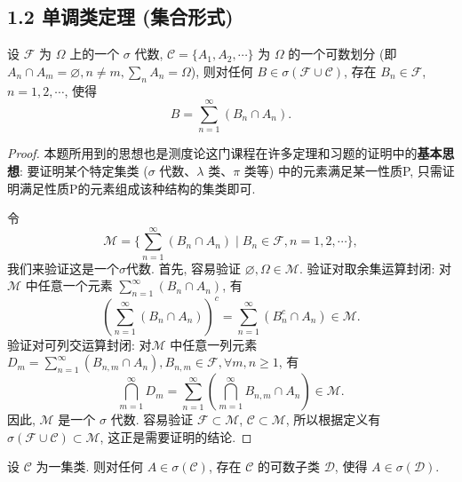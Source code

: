     \subsection{1.2 单调类定理 (集合形式)}
        \begin{2}
            设 $\mathcal{F}$ 为 $\Omega$ 上的一个 $\sigma$ 代数, 
            $\mathcal{C}=\{A_1, A_2,\cdots\}$ 为 $\Omega$ 的一个可数划分 
            (即 $A_n\cap A_m=\varnothing, n\not=m, \displaystyle\sum_nA_n=\Omega$), 
            则对任何 $B\in\sigma(\mathcal{F}\cup\mathcal{C})$, 存在 $B_n\in\mathcal{F}$, $n=1,2,\cdots$, 
            使得
            \[
                B=\sum_{n=1}^\infty(B_n\cap A_n).
            \]
        \end{2}
        \begin{proof}
            本题所用到的思想也是测度论这门课程在许多定理和习题的证明中的\textbf{基本思想}: 要证明某个特定集类 ($\sigma$ 代数、$\lambda$ 类、$\pi$ 类等) 中的元素满足某一性质P, 
            只需证明满足性质P的元素组成该种结构的集类即可.

            令
            \[
                \mathcal{M}=\{\displaystyle\sum_{n=1}^\infty(B_n \cap A_n)\mid B_n\in\mathcal{F}, n=1,2,\cdots\}, 
            \]
            我们来验证这是一个$\sigma$代数. 首先, 容易验证 $\varnothing,\Omega\in\mathcal{M}$. 
            验证对取余集运算封闭: 对 $\mathcal{M}$ 中任意一个元素 $\displaystyle\sum_{n=1}^\infty(B_n\cap A_n)$, 有
            \[
                (\sum_{n=1}^\infty(B_n\cap A_n))^c=\sum_{n=1}^\infty(B_n^c\cap A_n)\in\mathcal{M}.
            \]
            验证对可列交运算封闭: 对$\mathcal{M}$ 中任意一列元素 $D_m=\displaystyle\sum_{n=1}^\infty(B_{n,m}\cap A_n),B_{n,m}\in\mathcal{F},\forall m,n\geqslant1$, 有
            \[
                \bigcap_{m=1}^\infty D_m=\sum_{n=1}^\infty(\bigcap_{m=1}^\infty B_{n,m}\cap A_n)\in\mathcal{M}.
            \]
            因此, $\mathcal{M}$ 是一个 $\sigma$ 代数. 
            容易验证 $\mathcal{F}\subset\mathcal{M}$, $\mathcal{C}\subset\mathcal{M}$, 
            所以根据定义有 $\sigma(\mathcal{F}\cup\mathcal{C})\subset\mathcal{M}$, 
            这正是需要证明的结论.
        \end{proof}
        \begin{3}
            设 $\mathcal{C}$ 为一集类. 
            则对任何 $A\in\sigma(\mathcal{C})$, 
            存在 $\mathcal{C}$ 的可数子类 $\mathcal{D}$, 
            使得 $A\in\sigma(\mathcal{D})$.
        \end{3}
